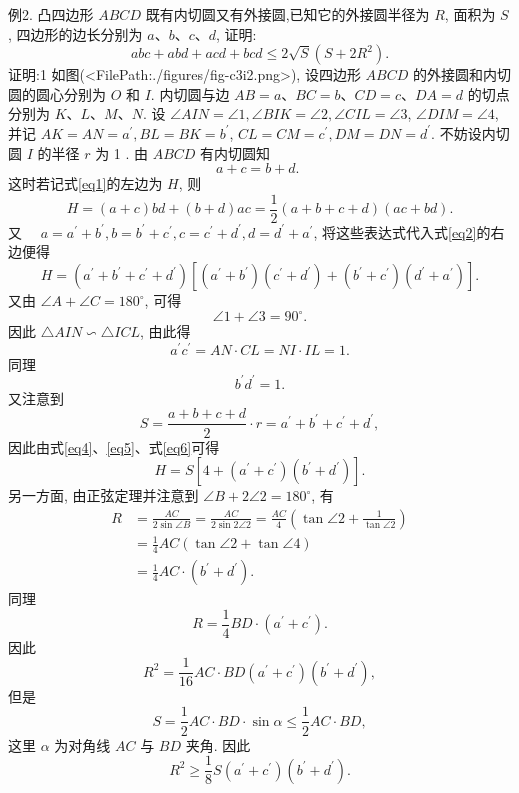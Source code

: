 例2. 凸四边形 $A B C D$ 既有内切圆又有外接圆,已知它的外接圆半径为 $R$, 面积为 $S$, 四边形的边长分别为 $a 、 b 、 c 、 d$, 证明:
$$
a b c+a b d+a c d+b c d \leqslant 2 \sqrt{S}\left(S+2 R^2\right) . \label{eq1}
$$
证明:1 如图(<FilePath:./figures/fig-c3i2.png>), 设四边形 $A B C D$ 的外接圆和内切圆的圆心分别为 $O$ 和 $I$. 内切圆与边 $A B=a 、 B C=b 、 C D=c 、 D A=d$ 的切点分别为 $K 、 L 、 M 、 N$. 设 $\angle A I N=\angle 1, \angle B I K=\angle 2, \angle C I L=\angle 3$, $\angle D I M=\angle 4$, 并记 $A K=A N=a^{\prime}, B L=B K=b^{\prime}$, $C L=C M=c^{\prime}, D M=D N=d^{\prime}$.
不妨设内切圆 $I$ 的半径 $r$ 为 1 . 由 $A B C D$ 有内切圆知
$$
a+c=b+d \text {. }
$$
这时若记式\ref{eq1}的左边为 $H$, 则
$$
H=(a+c) b d+(b+d) a c=\frac{1}{2}(a+b+c+d)(a c+b d) . \label{eq2}
$$
又 $\quad a=a^{\prime}+b^{\prime}, b=b^{\prime}+c^{\prime}, c=c^{\prime}+d^{\prime}, d=d^{\prime}+a^{\prime}$,
将这些表达式代入式\ref{eq2}的右边便得
$$
H=\left(a^{\prime}+b^{\prime}+c^{\prime}+d^{\prime}\right)\left[\left(a^{\prime}+b^{\prime}\right)\left(c^{\prime}+d^{\prime}\right)+\left(b^{\prime}+c^{\prime}\right)\left(d^{\prime}+a^{\prime}\right)\right] . \label{eq3}
$$
又由 $\angle A+\angle C=180^{\circ}$, 可得
$$
\angle 1+\angle 3=90^{\circ} .
$$
因此 $\triangle A I N \backsim \triangle I C L$, 由此得
$$
a^{\prime} c^{\prime}=A N \cdot C L=N I \cdot I L=1 . \label{eq4}
$$
同理
$$
b^{\prime} d^{\prime}=1 . \label{eq5}
$$
又注意到
$$
S=\frac{a+b+c+d}{2} \cdot r=a^{\prime}+b^{\prime}+c^{\prime}+d^{\prime}, \label{eq6}
$$
因此由式\ref{eq4}、\ref{eq5}、式\ref{eq6}可得
$$
H=S\left[4+\left(a^{\prime}+c^{\prime}\right)\left(b^{\prime}+d^{\prime}\right)\right] . \label{eq7}
$$
另一方面, 由正弦定理并注意到 $\angle B+2 \angle 2=180^{\circ}$, 有
$$
\begin{aligned}
R & =\frac{A C}{2 \sin \angle B}=\frac{A C}{2 \sin 2 \angle 2}=\frac{A C}{4}\left(\tan \angle 2+\frac{1}{\tan \angle 2}\right) \\
& =\frac{1}{4} A C(\tan \angle 2+\tan \angle 4) \\
& =\frac{1}{4} A C \cdot\left(b^{\prime}+d^{\prime}\right) .
\end{aligned}
$$
同理
$$
R=\frac{1}{4} B D \cdot\left(a^{\prime}+c^{\prime}\right) .
$$
因此
$$
R^2=\frac{1}{16} A C \cdot B D\left(a^{\prime}+c^{\prime}\right)\left(b^{\prime}+d^{\prime}\right),
$$
但是
$$
S=\frac{1}{2} A C \cdot B D \cdot \sin \alpha \leqslant \frac{1}{2} A C \cdot B D,
$$
这里 $\alpha$ 为对角线 $A C$ 与 $B D$ 夹角.
因此
$$
R^2 \geqslant \frac{1}{8} S\left(a^{\prime}+c^{\prime}\right)\left(b^{\prime}+d^{\prime}\right) .
$$
